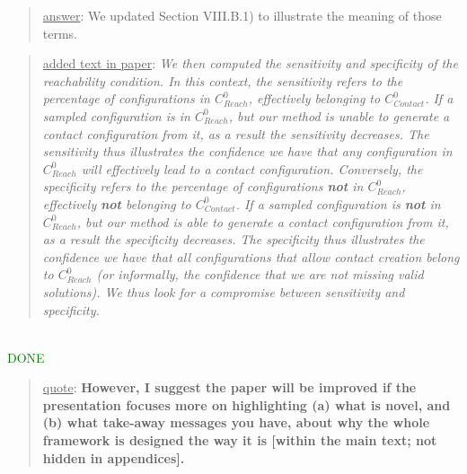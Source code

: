 \documentclass[a4paper]{article}
\newcommand{\gls}[1]{\textit{#1}}
\newcommand{\done}[0]{\textcolor{green}{DONE}}
\newcommand\quot[1]{\begin{quote} \underline{quote}: \textbf{#1}\end{quote}}
\newcommand\as[1]{\begin{quote} \underline{answer}: {#1}\end{quote} }
\newcommand\qt[1]{\begin{quote} \underline{added text in paper}: \textit{#1}\end{quote} \leavevmode \\ }
\begin{document}
\as{We updated Section VIII.B.1) to illustrate the meaning of those terms.}
\qt{We then computed the sensitivity and specificity of the reachability condition.  In this context, the sensitivity refers to the percentage of configurations in $C_{Reach}^0$, effectively belonging to \gls{$C_{Contact}^0$}. If a sampled configuration is in $C_{Reach}^0$, but our method is unable to generate a contact configuration from it, as a result the sensitivity
decreases. The sensitivity thus illustrates the confidence we have that any configuration in $C_{Reach}^0$ will effectively lead to a contact configuration.
Conversely, the specificity refers to the percentage of configurations \textbf{not} in $C_{Reach}^0$, effectively \textbf{not} belonging to \gls{$C_{Contact}^0$}.
If a sampled configuration is \textbf{not} in $C_{Reach}^0$, but our method is able to generate a contact configuration from it, as a result the specificity
decreases. The specificity thus illustrates the confidence we have that all configurations that allow contact creation belong to $C_{Reach}^0$ (or informally, the confidence that we are not missing valid solutions).
We thus look for a compromise between sensitivity and specificity.} \done

\quot{
However, I suggest the paper will be improved if
the presentation focuses more on highlighting (a) what is novel, and
(b)
what take-away messages you have, about why the whole framework is
designed the way it is [within the main text; not hidden in
appendices].}
\end{document}
